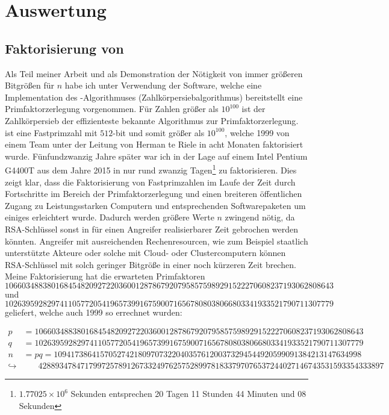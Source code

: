 \chapter{Auswertung}

\section{Faktorisierung von }

Als Teil meiner Arbeit und als Demonstration der Nötigkeit von immer größeren Bitgrößen für $n$ habe ich unter Verwendung der  Software, welche eine Implementation des -Algorithmuses (Zahlkörpersiebalgorithmus) bereitstellt eine Primfaktorzerlegung vorgenommen. Für Zahlen größer als $10^{100}$ ist der Zahlkörpersieb der effizienteste bekannte Algorithmus zur Primfaktorzerlegung\cite{SO2267146}.  ist eine Fastprimzahl mit $512$-bit und somit größer als $10^{100}$, welche 1999 von einem Team unter der Leitung von Herman te Riele in acht Monaten faktorisiert wurde\cite{rsa155}. Fünfundzwanzig Jahre später war ich in der Lage  auf einem Intel Pentium G4400T aus dem Jahre 2015 in nur rund zwanzig Tagen\footnote{$1.77025 \times 10^{6}$ Sekunden entsprechen 20 Tagen 11 Stunden 44 Minuten und 08 Sekunden} zu faktorisieren. Dies zeigt klar, dass die Faktorisierung von Fastprimzahlen im Laufe der Zeit durch Fortschritte im Bereich der Primfaktorzerlegung und einen breiteren öffentlichen Zugang zu Leistungsstarken Computern und entsprechenden Softwarepaketen um einiges erleichtert wurde. Dadurch werden größere Werte $n$ zwingend nötig, da RSA-Schlüssel sonst in für einen Angreifer realisierbarer Zeit gebrochen werden könnten. Angreifer mit ausreichenden Rechenresourcen, wie zum Beispiel staatlich unterstützte Akteure oder solche mit Cloud- oder Clustercomputern können RSA-Schlüssel mit solch geringer Bitgröße in einer noch kürzeren Zeit brechen. Meine Faktorisierung hat die erwarteten Primfaktoren $106603488380168454820927220360012878679207958575989291522270608237193062808643$ und $102639592829741105772054196573991675900716567808038066803341933521790711307779$ geliefert, welche auch 1999 so errechnet wurden:

\begin{equation}
  \begin{split}
    p&=106603488380168454820927220360012878679207958575989291522270608237193062808643\\
    q&=102639592829741105772054196573991675900716567808038066803341933521790711307779\\
    n&=pq=1094173864157052742180970732204035761200373294544920599091384213147634998\\\hookrightarrow&\phantom{=}\;\,4288934784717997257891267332497625752899781833797076537244027146743531593354333897
  \end{split}
\end{equation}


